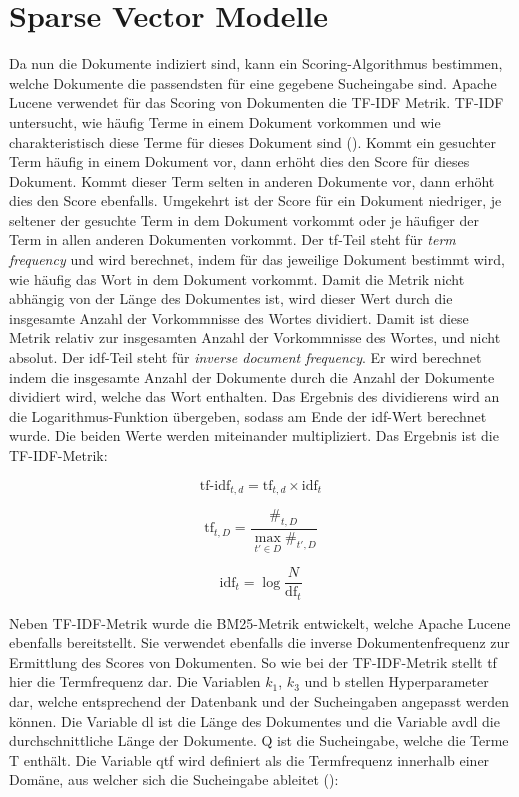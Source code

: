 \section{Sparse Vector Modelle}
\label{chap:sparse-vector-models}
Da nun die Dokumente indiziert sind, kann ein Scoring-Algorithmus bestimmen, welche Dokumente die passendsten für eine gegebene Sucheingabe sind.
Apache Lucene verwendet für das Scoring von Dokumenten die TF-IDF Metrik.
TF-IDF untersucht, wie häufig Terme in einem Dokument vorkommen und wie charakteristisch diese Terme für dieses Dokument sind (\cite{Manning_Raghavan_Schuetze_2019}).
Kommt ein gesuchter Term häufig in einem Dokument vor, dann erhöht dies den Score für dieses Dokument.
Kommt dieser Term selten in anderen Dokumente vor, dann erhöht dies den Score ebenfalls.
Umgekehrt ist der Score für ein Dokument niedriger, je seltener der gesuchte Term in dem Dokument vorkommt oder je häufiger der Term in allen anderen Dokumenten vorkommt.
Der tf-Teil steht für \textit{term frequency} und wird berechnet, indem für das jeweilige Dokument bestimmt wird, wie häufig das Wort in dem Dokument vorkommt.
Damit die Metrik nicht abhängig von der Länge des Dokumentes ist, wird dieser Wert durch die insgesamte Anzahl der Vorkommnisse des Wortes dividiert.
Damit ist diese Metrik relativ zur insgesamten Anzahl der Vorkommnisse des Wortes, und nicht absolut.
Der idf-Teil steht für \textit{inverse document frequency}.
Er wird berechnet indem die insgesamte Anzahl der Dokumente durch die Anzahl der Dokumente dividiert wird, welche das Wort enthalten.
Das Ergebnis des dividierens wird an die Logarithmus-Funktion übergeben, sodass am Ende der idf-Wert berechnet wurde.
Die beiden Werte werden miteinander multipliziert.
Das Ergebnis ist die TF-IDF-Metrik:

\[\text{tf-idf}_{t,d}=\text{tf}_{t,d} \times \text{idf}_t\]

\[\text{tf}_{t,D}=\frac {\#_{t,D}}{\max _{t'\in D}\#_{t',D}}\]

\[\text{idf}_t=\log {\frac {N}{\text{df}_t}}\]

Neben TF-IDF-Metrik wurde die BM25-Metrik entwickelt, welche Apache Lucene ebenfalls bereitstellt.
Sie verwendet ebenfalls die inverse Dokumentenfrequenz zur Ermittlung des Scores von Dokumenten.
So wie bei der TF-IDF-Metrik stellt tf hier die Termfrequenz dar.
Die Variablen \(k_1\), \(k_3\) und b stellen Hyperparameter dar, welche entsprechend der Datenbank und der Sucheingaben angepasst werden können.
Die Variable dl ist die Länge des Dokumentes und die Variable avdl die durchschnittliche Länge der Dokumente.
Q ist die Sucheingabe, welche die Terme T enthält.
Die Variable qtf wird definiert als die Termfrequenz innerhalb einer Domäne, aus welcher sich die Sucheingabe ableitet (\cite{Beaulieu_Track_Sparck_Karen_Willett_Peter}):

